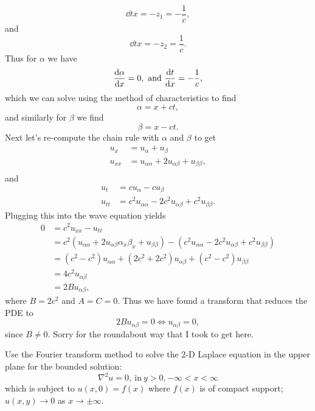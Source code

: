 \documentclass[12pt]{report}
\begin{document}
\begin{solution}
    \[ 
        \dd{t}{x} = -z_1 = - \frac{1}{c},
    \]
    and
    \[ 
        \dd{t}{x} = -z_2 = \frac{1}{c}.
    \]
    Thus for $\alpha$ we have 
    \[ 
        \frac{\mathrm{d} \alpha}{\mathrm{d} x} = 0, {~\text{and}~} \frac{\mathrm{d} t}{\mathrm{d} x} = -\frac{1}{c},
    \]
    which we can solve using the method of characteristics to find
    \[ 
        \alpha = x + ct,
    \]
    and similarly for $\beta$ we find 
    \[ 
        \beta = x - ct.
    \] 
    Next let's re-compute the chain rule with $\alpha$ and $\beta$ to get
    \begin{align*}
        u_x &= u_\alpha + u_\beta\\
        u_{xx} &= u_{\alpha \alpha} + 2u_{\alpha \beta} + u_{\beta \beta},\\
    \end{align*}
    and
    \begin{align*}
        u_t &= cu_\alpha - cu_\beta\\
        u_{tt} &= c^2u_{\alpha \alpha} - 2c^2u_{\alpha \beta} + c^2u_{\beta \beta}.
    \end{align*}
    Plugging this into the wave equation yields
    \begin{align*}
        0 &= c^2u_{xx} - u_{tt}\\
        &= c^2(u_{\alpha \alpha} + 2u_{\alpha \beta}\alpha_x\beta_x + u_{\beta \beta}) - ( c^2u_{\alpha \alpha} - 2c^2u_{\alpha \beta} + c^2u_{\beta \beta})\\
        &= (c^2 - c^2)u_{\alpha \alpha}+ (2c^2 + 2c^2)u_{\alpha \beta} +(c^2 - c^2)u_{\beta \beta}\\
        &= 4c^2 u_{\alpha \beta}\\
        &= 2 B u_{\alpha \beta},
    \end{align*} 
    where $B = 2c^2$ and $A = C = 0$. Thus we have found a transform that reduces the PDE to
    \[
        2Bu_{\alpha \beta} = 0 \iff u_{\alpha \beta} = 0, 
    \]
    since $B \neq 0$. Sorry for the roundabout way that I took to get here. 
\end{solution}

\newpage



\begin{problem}
    Use the Fourier transform method to solve the 2-D Laplace equation in the upper plane for the bounded solution:
    \[
        \nabla^2 u = 0, ~\text{in}~ y>0, -\infty < x <\infty
    \]
    which is subject to $u(x,0) = f(x)$ where $f(x)$ is of compact support; $u(x,y) \to 0$ as $x \to \pm \infty$.
\end{problem}
\end{document}
